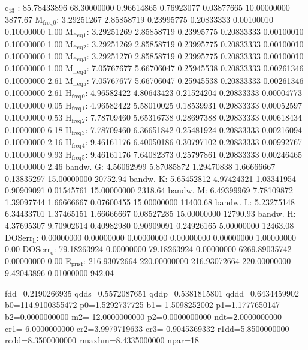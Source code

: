 \documentclass[11pt]{article}
\begin{document}
c\(_{\text{13}}\)    :  85.78433896  68.30000000   0.96614865   0.76923077   0.03877665  10.00000000      3877.67
M\(_{\text{freq}}\)\(_{\text{0}}\):   3.29251267   2.85858719   0.23995775   0.20833333   0.00100010   0.10000000         1.00
M\(_{\text{freq}}\)\(_{\text{1}}\):   3.29251269   2.85858719   0.23995775   0.20833333   0.00100010   0.10000000         1.00
M\(_{\text{freq}}\)\(_{\text{2}}\):   3.29251269   2.85858719   0.23995775   0.20833333   0.00100010   0.10000000         1.00
M\(_{\text{freq}}\)\(_{\text{3}}\):   3.29251270   2.85858719   0.23995775   0.20833333   0.00100010   0.10000000         1.00
M\(_{\text{freq}}\)\(_{\text{4}}\):   7.05767677   5.66706047   0.25945538   0.20833333   0.00261346   0.10000000         2.61
M\(_{\text{freq}}\)\(_{\text{5}}\):   7.05767677   5.66706047   0.25945538   0.20833333   0.00261346   0.10000000         2.61
H\(_{\text{freq}}\)\(_{\text{0}}\):   4.96582422   4.80643423   0.21524204   0.20833333   0.00004773   0.10000000         0.05
H\(_{\text{freq}}\)\(_{\text{1}}\):   4.96582422   5.58010025   0.18539931   0.20833333   0.00052597   0.10000000         0.53
H\(_{\text{freq}}\)\(_{\text{2}}\):   7.78709460   5.65316738   0.28697388   0.20833333   0.00618434   0.10000000         6.18
H\(_{\text{freq}}\)\(_{\text{3}}\):   7.78709460   6.36651842   0.25481924   0.20833333   0.00216094   0.10000000         2.16
H\(_{\text{freq}}\)\(_{\text{4}}\):   9.46161176   6.40050186   0.30797102   0.20833333   0.00992767   0.10000000         9.93
H\(_{\text{freq}}\)\(_{\text{5}}\):   9.46161176   7.64082373   0.25797861   0.20833333   0.00246465   0.10000000         2.46
bandw. G:   4.56062999   5.87085872   1.29470838   1.66666667   0.13835297  15.00000000     20752.94
bandw. K:   5.65452812   4.97424321   1.03341954   0.90909091   0.01545761  15.00000000      2318.64
bandw. M:   6.49399969   7.78109872   1.39097744   1.66666667   0.07600455  15.00000000     11400.68
bandw. L:   5.23275148   6.34433701   1.37465151   1.66666667   0.08527285  15.00000000     12790.93
bandw. H:   4.37695307   9.70902614   0.40982980   0.90909091   0.24926165   5.00000000     12463.08
DOSerr\(_{\text{h}}\):   0.00000000   0.00000000   0.00000000   0.00000000   0.00000000   1.00000000         0.00
DOSerr\(_{\text{o}}\):  79.18263924   0.00000000  79.18263924   0.00000000 6269.89035742   0.00000000         0.00
E\(_{\text{pris}}\)\(_{\text{f}}\): 216.93072664 220.00000000 216.93072664 220.00000000   9.42043896   0.01000000       942.04

fdd=0.2190266935 qdds=0.5572087651 qddp=0.5381815801 qddd=0.6434459902 b0=114.9100355472 p0=1.5292737725 b1=-1.5098252002 p1=1.1777650147 b2=0.0000000000 m2=-12.0000000000 p2=0.0000000000 ndt=2.0000000000 cr1=-6.0000000000 cr2=3.9979719633 cr3=-0.9045369332 r1dd=5.8500000000 rcdd=8.3500000000 rmaxhm=8.4335000000 npar=18 
\end{document}

